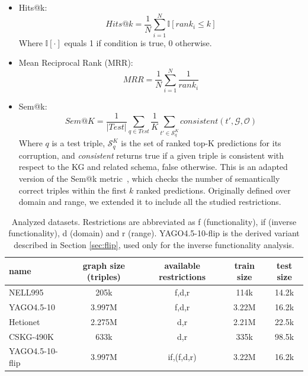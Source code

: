 \documentclass[a4paper,UKenglish,cleveref, autoref, thm-restate]{tgdk-v2021}
\begin{document}
\begin{itemize}
    \item  Hits@k: 
    \[
    \textit{Hits@}k = \frac{1}{N} \sum_{i=1}^{N} \mathbb{I} \left[ \textit{rank}_i \leq k \right]
    \]
    Where $\mathbb{I}[\cdot]$ equals 1 if condition is true, 0 otherwise.
    \item Mean Reciprocal Rank (MRR): 
    \[
    \textit{MRR} = \frac{1}{N} \sum_{i=1}^{N} \frac{1}{\textit{rank}_i}
    \]
     \item Sem@k:
    \[\textit{Sem}@K = \frac{1}{|\textit{Test}|} \sum_{q \in \textit{Test}} \frac{1}{K} \sum_{t' \in \mathcal{S}_q^K} \textit{consistent}(t',\mathcal{G},\mathcal{O})
    \]
    Where $q$ is a test triple, $\mathcal{S}_q^K$ is the set of ranked top-K predictions for its corruption, and \textit{consistent} returns true if a given triple is consistent with respect to the KG and related schema, false otherwise. This is an adapted version of the Sem@k metric~\cite{hubert_treat_2024}, which checks the number of semantically correct triples within the first $k$ ranked predictions. Originally defined over domain and range, we extended it to include all the studied restrictions.
\end{itemize}




\begin{table}[]
    \centering
    \caption{Analyzed datasets. Restrictions are abbreviated as f (functionality), if (inverse functionality), d (domain) and r (range). YAGO4.5-10-flip is the derived variant described in Section \ref{sec:flip}, used only for the inverse functionality analysis.}
    \begin{tabular}{l|c|c|c|c}
         name & graph size (triples) & available restrictions & train size & test size \\
         \hline
         NELL995 & 205k & f,d,r & 114k & 14.2k \\
         YAGO4.5-10 & 3.997M & f,d,r & 3.22M & 16.2k\\
         Hetionet & 2.275M & d,r & 2.21M & 22.5k \\
         CSKG-490K & 633k & d,r & 335k & 98.5k \\
         YAGO4.5-10-flip & 3.997M & if,(f,d,r) & 3.22M & 16.2k \\
    \end{tabular}
    \label{tab:datasets}
\end{table}

\end{document}
